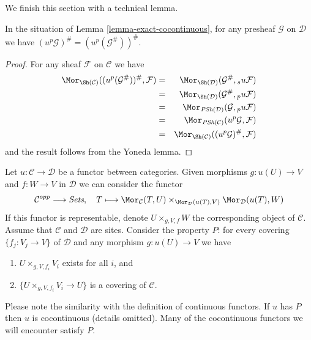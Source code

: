 \noindent
We finish this section with a technical lemma.

\begin{lemma}
\label{lemma-technical-pu}
In the situation of Lemma \ref{lemma-exact-cocontinuous}, for any presheaf $\mathcal{G}$ on $\mathcal{D}$
we have $(u^p\mathcal{G})^\# = (u^p(\mathcal{G}^\#))^\#$.
\end{lemma}

\begin{proof}
For any sheaf $\mathcal{F}$ on $\mathcal{C}$ we have
\begin{eqnarray*}
\Mor_{\Sh(\mathcal{C})}((u^p(\mathcal{G}^\#))^\#, \mathcal{F})
& = &
\Mor_{\Sh(\mathcal{D})}(\mathcal{G}^\#, {}_su\mathcal{F}) \\
& = &
\Mor_{\Sh(\mathcal{D})}(\mathcal{G}^\#, {}_pu\mathcal{F}) \\
& = &
\Mor_{\textit{PSh}(\mathcal{D})}(\mathcal{G}, {}_pu\mathcal{F}) \\
& = &
\Mor_{\textit{PSh}(\mathcal{C})}(u^p\mathcal{G}, \mathcal{F}) \\
& = &
\Mor_{\Sh(\mathcal{C})}((u^p\mathcal{G})^\#, \mathcal{F})
\end{eqnarray*}
and the result follows from the Yoneda lemma.
\end{proof}

\begin{remark}
\label{remark-cartesian-cocontinuous}
Let $u : \mathcal{C} \to \mathcal{D}$ be a functor between categories.
Given morphisms $g : u(U) \to V$ and $f : W \to V$ in $\mathcal{D}$
we can consider the functor
$$
\mathcal{C}^{opp} \longrightarrow \textit{Sets},\quad
T \longmapsto
\Mor_\mathcal{C}(T, U)
\times_{\Mor_\mathcal{D}(u(T), V)}
\Mor_\mathcal{D}(u(T), W)
$$
If this functor is representable, denote $U \times_{g, V, f} W$
the corresponding object of $\mathcal{C}$.
Assume that $\mathcal{C}$ and $\mathcal{D}$ are sites.
Consider the property $P$: for every covering $\{f_j : V_j \to V\}$
of $\mathcal{D}$ and any morphism $g : u(U) \to V$ we have
\begin{enumerate}
\item $U \times_{g, V, f_i} V_i$ exists for all $i$, and
\item $\{U \times_{g, V, f_i} V_i \to U\}$ is a covering of $\mathcal{C}$.
\end{enumerate}
Please note the similarity with the definition of continuous
functors. If $u$ has $P$ then $u$ is cocontinuous (details omitted).
Many of the cocontinuous functors we will encounter satisfy $P$.
\end{remark}


